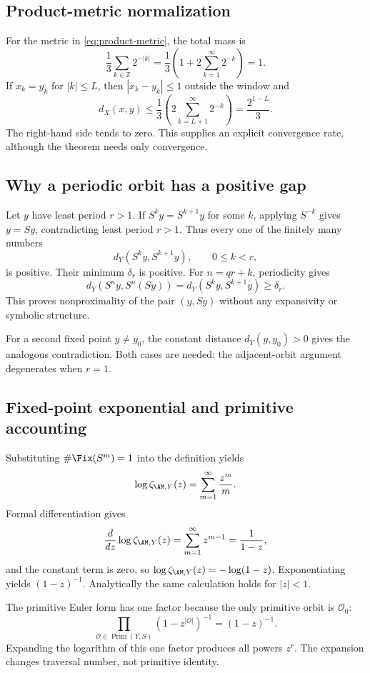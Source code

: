\subsection{Product-metric normalization}

For the metric in \cref{eq:product-metric}, the total mass is
\[
  \frac13\sum_{k\in\mathbb Z}2^{-|k|}
  =\frac13\left(1+2\sum_{k=1}^{\infty}2^{-k}\right)=1.
\]
If \(x_k=y_k\) for \(|k|\leq L\), then \(|x_k-y_k|\leq1\) outside the
window and
\[
  d_X(x,y)
  \leq\frac13\left(2\sum_{k=L+1}^{\infty}2^{-k}\right)
  =\frac{2^{1-L}}{3}.
\]
The right-hand side tends to zero.  This supplies an explicit convergence
rate, although the theorem needs only convergence.

\subsection{Why a periodic orbit has a positive gap}

Let \(y\) have least period \(r>1\).  If
\(S^k y=S^{k+1}y\) for some \(k\), applying \(S^{-k}\) gives \(y=Sy\),
contradicting least period \(r>1\).  Thus every one of the finitely many
numbers
\[
  d_Y(S^k y,S^{k+1}y),\qquad 0\leq k<r,
\]
is positive.  Their minimum \(\delta_r\) is positive.  For
\(n=qr+k\), periodicity gives
\[
  d_Y(S^n y,S^n(Sy))
  =d_Y(S^k y,S^{k+1}y)\geq\delta_r.
\]
This proves nonproximality of the pair \((y,Sy)\) without any expansivity or
symbolic structure.

For a second fixed point \(y\neq y_0\), the constant distance
\(d_Y(y,y_0)>0\) gives the analogous contradiction.  Both cases are needed:
the adjacent-orbit argument degenerates when \(r=1\).

\subsection{Fixed-point exponential and primitive accounting}

Substituting \(\#\Fix(S^m)=1\) into the definition yields
\[
  \log\zeta_{\AM,Y}(z)=\sum_{m=1}^{\infty}\frac{z^m}{m}.
\]
Formal differentiation gives
\[
  \frac{d}{dz}\log\zeta_{\AM,Y}(z)
  =\sum_{m=1}^{\infty}z^{m-1}=\frac{1}{1-z},
\]
and the constant term is zero, so
\(\log\zeta_{\AM,Y}(z)=-\log(1-z)\).  Exponentiating yields
\((1-z)^{-1}\).  Analytically the same calculation holds for \(|z|<1\).

The primitive Euler form has one factor because the only primitive orbit is
\(\mathcal O_0\):
\[
  \prod_{\mathcal O\in\operatorname{Prim}(Y,S)}
  (1-z^{|\mathcal O|})^{-1}
  =(1-z)^{-1}.
\]
Expanding the logarithm of this one factor produces all powers \(z^r\).
The expansion changes traversal number, not primitive identity.

